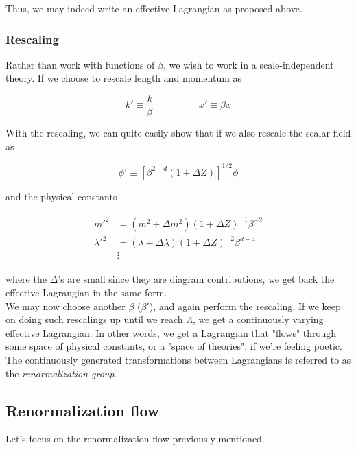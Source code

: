 \documentclass[10pt]{report}
\begin{document}
	Thus, we may indeed write an effective Lagrangian as proposed above.\\
	
	\subsubsection{Rescaling}
	Rather than work with functions of $\beta$, we wish to work in a scale-independent theory. If we choose to rescale length and momentum as
	
	\begin{equation}
		k' \equiv \frac{k}{\beta} \hspace{2cm} x' \equiv \beta x
	\end{equation}
	
	With the rescaling, we can quite easily show that if we also rescale the scalar field as
	
	\begin{equation}
		\phi' \equiv \left[\beta^{2-d}(1+\Delta Z)\right]^{1/2}\phi
	\end{equation}
	
	and the physical constants
	
	\begin{align}
		\begin{split}
			m'^2 &= \left(m^2 + \Delta m^2\right)(1+\Delta Z)^{-1}\beta^{-2} \\
			\lambda'^2 &= \left(\lambda + \Delta \lambda\right)(1+\Delta Z)^{-2}\beta^{d-4} \\
			&\vdots
		\end{split}
	\end{align}
	
	where the $\Delta$'s are small since they are diagram contributions, we get back the effective Lagrangian in the same form.\\
	We may now choose another $\beta$ ($\beta'$), and again perform the rescaling. If we keep on doing such rescalings up until we reach $\Lambda$, we get a continuously varying effective Lagrangian. In other words, we get a Lagrangian that "flows" through some space of physical constants, or a "space of theories", if we're feeling poetic. The continuously generated transformations between Lagrangians is referred to as the \emph{renormalization group}.
	
	\subsection{Renormalization flow}
	Let's focus on the renormalization flow previously mentioned.
	
\end{document}
